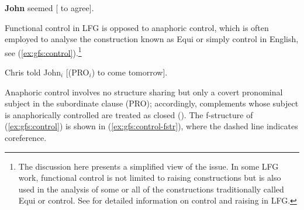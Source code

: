 \documentclass[output=paper]{../langscibook}
\begin{document}
\begin{exe}
  \textbf{John} seemed \textup{[}{\GAP} to agree\textup{]}.

 \end{exe}
 
 Functional control in LFG is opposed to anaphoric control, which is often employed to analyse the construction known as Equi or simply control in English, see (\ref{ex:gfs:control}).\footnote{The discussion here presents a simplified view of the issue. In some LFG work, functional control is not limited to raising constructions but is also used in the analysis of some or all of the constructions traditionally called Equi or control. See  for detailed information on control and raising in LFG.}

 \ea\label{ex:gfs:control}
    Chris told John$_i$ [(PRO$_i$) to come tomorrow].
\z

 \noindent Anaphoric control involves no structure sharing but only a covert pronominal subject in the subordinate clause (PRO); accordingly, complements whose subject is anaphorically controlled are treated as closed (\COMP). The f-structure of (\ref{ex:gfs:control}) is shown in (\ref{ex:gfs:control-fstr}), where the dashed line indicates coreference. 

\end{document}
